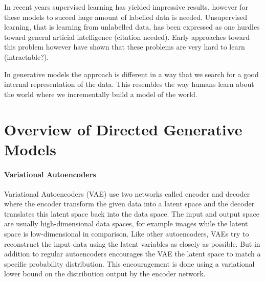 \documentclass[twoside,11pt,a4paper]{article}
\theoremstyle{break}
\begin{document}
In recent years supervised learning has yielded impressive results,
however for these models to suceed huge amount of labelled data is needed.
Unsupervised learning, that is learning from unlabelled data, has been expressed
as one hurdles toward general articial intelligence (citation needed).
Early approaches toward this problem however have shown that these problems are very hard to learn (intractable?).

In generative models the approach is different in a way that
we search for a good internal representation of the data.
This resembles the way humans learn about the world where we incrementally build
a model of the world.


\section{Overview of Directed Generative Models}
\label{sec:overview}


\paragraph{Variational Autoencoders\cite{vae:2013}}
\label{par:overview_vae}
Variational Autoencoders (VAE) use two networks called encoder and decoder where the encoder transform the given data into a latent space and the decoder translates this latent space back into the data space.
The input and output space are usually high-dimensional data spaces, for example images while the latent space is low-dimensional in comparison.
Like other autoencoders, VAEs try to reconstruct the input data using the latent variables as closely as possible.
But in addition to regular autoencoders encourages the VAE the latent space to match a specific probability distribution.
This encouragement is done using a variational lower bound on the distribution output by the encoder network.


\end{document}
